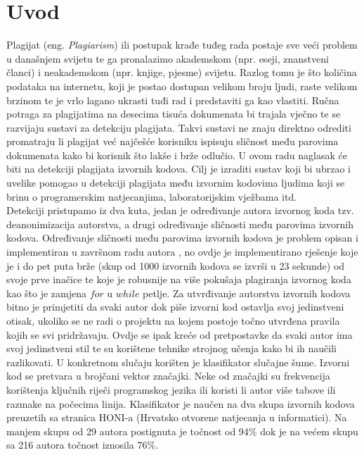 \chapter*{Uvod}

	Plagijat (eng. \textit{Plagiarism}) ili postupak krađe tuđeg rada postaje sve veći problem u današnjem svijetu te ga pronalazimo akademskom (npr. eseji, znanstveni članci) i neakademskom (npr. knjige, pjesme) svijetu. Razlog tomu je što količina podataka na internetu, koji je postao dostupan velikom broju ljudi, raste velikom brzinom te je vrlo lagano ukrasti tuđi rad i predstaviti ga kao vlastiti. Ručna potraga za plagijatima na desecima tisuća dokumenata bi trajala vječno te se razvijaju sustavi za detekciju plagijata. Takvi sustavi ne znaju direktno odrediti promatraju li plagijat već najčešće korisniku ispisuju sličnost među parovima dokumenata kako bi korisnik što lakše i brže odlučio. U ovom radu naglasak će biti na detekciji plagijata izvornih kodova. Cilj je izraditi sustav koji bi ubrzao i uvelike pomogao u detekciji plagijata među izvornim kodovima ljudima koji se brinu o programerskim natjecanjima, laboratorijskim vježbama itd. \\

	Detekciji pristupamo iz dva kuta, jedan je određivanje autora izvornog koda tzv. deanonimizacija autorstva, a drugi određivanje sličnosti među parovima izvornih kodova. Određivanje sličnosti među parovima izvornih kodova je problem opisan i implementiran u završnom radu autora \cite{plagijator}, no ovdje je implementirano rješenje koje je i do pet puta brže (skup od 1000 izvornih kodova se izvrši u 23 sekunde) od svoje prve inačice te koje je robusnije na više pokušaja plagiranja izvornog koda kao što je zamjena $for$ u $while$ petlje. Za utvrđivanje autorstva izvornih kodova bitno je primjetiti da svaki autor dok piše izvorni kod ostavlja svoj jedinstveni otisak, ukoliko se ne radi o projektu na kojem postoje točno utvrđena pravila kojih se svi pridržavaju. Ovdje se ipak kreće od pretpostavke da svaki autor ima svoj jedinstveni stil te su korištene tehnike strojnog učenja kako bi ih naučili razlikovati. U konkretnom slučaju korišten je klasifikator slučajne šume. Izvorni kod se pretvara u brojčani vektor značajki. Neke od značajki su frekvencija korištenja ključnih riječi programskog jezika ili koristi li autor više tabove ili razmake na počecima linija. Klasifikator je naučen na dva skupa izvornih kodova preuzetih sa stranica HONI-a (Hrvatsko otvorene natjecanja u informatici). Na manjem skupu od 29 autora postignuta je točnost od 94\% dok je na većem skupu sa 216 autora točnost iznosila 76\%.

